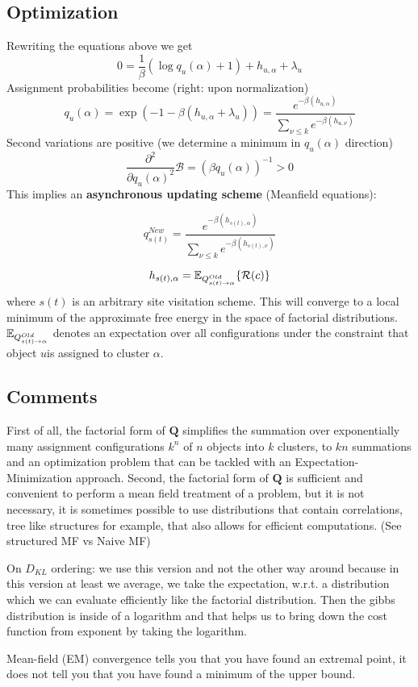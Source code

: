 \documentclass[12pt]{article}
\begin{document}
\subsection{Optimization}
Rewriting the equations above we get
\[ 0 = \frac{1}{\beta} (\log q_u(\alpha) + 1) + h_{u,\alpha} + \lambda_u \]
Assignment probabilities become (right: upon normalization)
\[ q_u(\alpha) = \exp(-1-\beta(h_{u,\alpha} + \lambda_u)) = 
\frac{e^{-\beta(h_{u,\alpha})}}{\sum_{\nu\leq k}e^{-\beta(h_{u,\nu})}} \]
Second variations are positive (we determine a minimum in $q_u(\alpha)$ direction)
\[ \frac{\partial^2}{\partial q_u(\alpha)^2} \mathcal{B} = (\beta q_u(\alpha))^{-1} > 0 \]
This implies an \textbf{asynchronous updating scheme} (Meanfield equations):
\ulb
\item \[ q_{s(t)}^{New} = \frac{e^{-\beta (h_{s(t),\alpha})}}
{\sum_{\nu\leq k}e^{-\beta (h_{s(t),\nu})}} \]
\item \[ h_{s(t),\alpha} = \operatorname{\mathbb{E}}_{Q^{Old}_{s(t)\rightarrow\alpha}}
\{\mathcal{R}(c)\} \]
\ule
where $s(t)$ is an arbitrary site visitation scheme. This will converge to a local minimum of the approximate free energy in the space of factorial distributions. $\operatorname{\mathbb{E}}_{Q^{Old}_{s(t)\rightarrow\alpha}}$ denotes an expectation over all configurations under the constraint that object $u $is assigned to
cluster $\alpha$.

\subsection{Comments}
\par First of all, the factorial form of $\mathbf{Q}$ simplifies the summation over exponentially many assignment configurations $k^n$ of $n$ objects into $k$ clusters, to $kn$ summations and an optimization problem that can be tackled with an Expectation-Minimization approach. Second, the factorial form of $\mathbf{Q}$ is sufficient and convenient to perform a mean field treatment of a problem, but it is not necessary, it is sometimes possible to use distributions that contain correlations, tree like structures for example, that also allows for efficient computations. (See structured MF vs Naive MF)
\par On $D_{KL}$ ordering: we use this version and not the other way around because in this version at least we average, we take the expectation, w.r.t. a distribution which we can evaluate efficiently like the factorial distribution. Then the gibbs distribution is inside of a logarithm and that helps us to bring down the cost function from exponent by taking the logarithm.
\par Mean-field (EM) convergence tells you that you have found an extremal point, it does not tell you that you have found a minimum of the upper bound.
\end{document}
